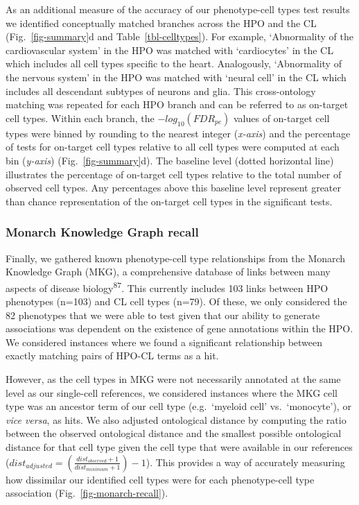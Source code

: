 \documentclass[
]{article}
\begin{document}
As an additional measure of the accuracy of our phenotype-cell types
test results we identified conceptually matched branches across the HPO
and the CL (Fig.~\ref{fig-summary}d and Table~\ref{tbl-celltypes}). For
example, `Abnormality of the cardiovascular system' in the HPO was
matched with `cardiocytes' in the CL which includes all cell types
specific to the heart. Analogously, `Abnormality of the nervous system'
in the HPO was matched with `neural cell' in the CL which includes all
descendant subtypes of neurons and glia. This cross-ontology matching
was repeated for each HPO branch and can be referred to as on-target
cell types. Within each branch, the \(-log_{10}(FDR _{pc})\) values of
on-target cell types were binned by rounding to the nearest integer
(\emph{x-axis}) and the percentage of tests for on-target cell types
relative to all cell types were computed at each bin (\emph{y-axis})
(Fig.~\ref{fig-summary}d). The baseline level (dotted horizontal line)
illustrates the percentage of on-target cell types relative to the total
number of observed cell types. Any percentages above this baseline level
represent greater than chance representation of the on-target cell types
in the significant tests.

\subsubsection{Monarch Knowledge Graph
recall}\label{monarch-knowledge-graph-recall-1}

Finally, we gathered known phenotype-cell type relationships from the
Monarch Knowledge Graph (MKG), a comprehensive database of links between
many aspects of disease biology\textsuperscript{87}. This currently
includes 103 links between HPO phenotypes (n=103) and CL cell types
(n=79). Of these, we only considered the 82 phenotypes that we were able
to test given that our ability to generate associations was dependent on
the existence of gene annotations within the HPO. We considered
instances where we found a significant relationship between exactly
matching pairs of HPO-CL terms as a hit.

However, as the cell types in MKG were not necessarily annotated at the
same level as our single-cell references, we considered instances where
the MKG cell type was an ancestor term of our cell type (e.g.~`myeloid
cell' vs.~`monocyte'), or \emph{vice versa}, as hits. We also adjusted
ontological distance by computing the ratio between the observed
ontological distance and the smallest possible ontological distance for
that cell type given the cell type that were available in our references
(\(dist_{adjusted}=(\frac{dist_{observed}+1}{dist_{minimum}+1})-1\)).
This provides a way of accurately measuring how dissimilar our
identified cell types were for each phenotype-cell type association
(Fig.~\ref{fig-monarch-recall}).
\end{document}
